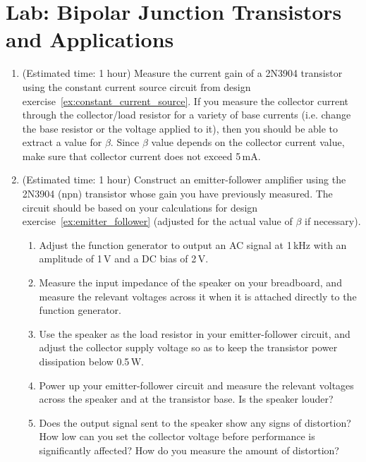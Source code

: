 \documentclass{article}
\begin{document}
\section{Lab: Bipolar Junction Transistors and Applications}

\begin{enumerate}
\item (Estimated time: 1 hour) Measure the current gain of a 2N3904 transistor using the constant current source circuit from design exercise~\ref{ex:constant_current_source}. If you measure the collector current through the collector/load resistor for a variety of base currents (i.e. change the base resistor or the voltage applied to it), then you should be able to extract a value for $\beta$. Since $\beta$ value depends on the collector current value, make sure that collector current does not exceed 5\,mA.


\item (Estimated time: 1 hour) Construct an emitter-follower amplifier using the 2N3904 (npn) transistor whose gain you have previously measured. The circuit should be based on your calculations for design exercise~\ref{ex:emitter_follower} (adjusted for the actual value of $\beta$ if necessary).
\begin{enumerate}
\item Adjust the function generator to output an AC signal at 1\,kHz with an amplitude of 1\,V and a DC bias of 2\,V.
\item Measure the input impedance of the speaker on your breadboard, and measure the relevant voltages across it when it is attached directly to the function generator.
\item Use the speaker as the load resistor in your emitter-follower circuit, and adjust the collector supply voltage so as to keep the transistor power dissipation below 0.5\,W.
\item Power up your emitter-follower circuit and measure the relevant voltages across the speaker and at the transistor base. Is the speaker louder?
\item Does the output signal sent to the speaker show any signs of distortion? How low can you set the collector voltage before performance is significantly affected? How do you measure the amount of distortion?
\end{enumerate}


\end{enumerate}
\end{document}
